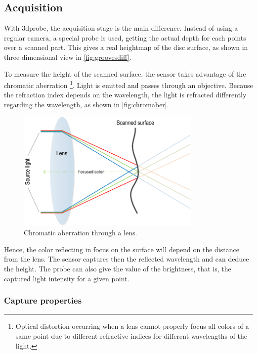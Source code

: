 \subsection{Acquisition}

With \gls{3dprobe}, the acquisition stage is the main difference. Instead of using a regular camera, a special probe is used, getting the actual depth for each points over a scanned part. This gives a real heightmap of the disc surface, as shown in three-dimensional view in \autoref{fig:groovesdiff}.

To measure the height of the scanned surface, the sensor takes advantage of the chromatic aberration \footnote{Optical distortion occurring when a lens cannot properly focus all colors of a same point due to different refractive indices for different wavelengths of the light.}. Light is emitted and passes through an objective. Because the refraction index depends on the wavelength, the light is refracted differently regarding the wavelength, as shown in \autoref{fig:chromaber}.

\begin{figure}[!ht]
\centering
\includegraphics[width=0.8\textwidth]{images/chromatic-aberration}
\caption{Chromatic aberration through a lens.}
\label{fig:chromaber}
\end{figure}

Hence, the color reflecting in focus on the surface will depend on the distance from the lens. The sensor captures then the reflected wavelength and can deduce the height. The probe can also give the value of the brightness, that is, the captured light intensity for a given point.

\subsubsection{Capture properties}


